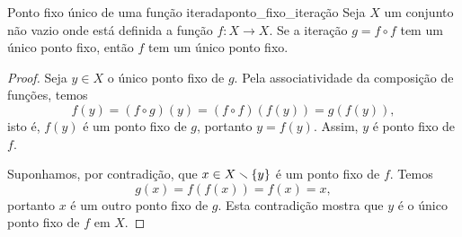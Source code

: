 \begin{lemma}{Ponto fixo único de uma função iterada}{ponto_fixo_iteração}
    Seja \(X\) um conjunto não vazio onde está definida a função \(f : X \to X\). Se a iteração \(g = f\circ f\) tem um único ponto fixo, então \(f\) tem um único ponto fixo.
\end{lemma}
\begin{proof}
    Seja \(y \in X\) o único ponto fixo de \(g\). Pela associatividade da composição de funções, temos
    \begin{equation*}
        f(y) = (f\circ g)(y) = (f\circ f)(f(y)) = g(f(y)),
    \end{equation*}
    isto é, \(f(y)\) é um ponto fixo de \(g\), portanto \(y = f(y)\). Assim, \(y\) é ponto fixo de \(f\).

    Suponhamos, por contradição, que \(x \in X\smallsetminus \{y\}\) é um ponto fixo de \(f\). Temos
    \begin{equation*}
        g(x) = f(f(x)) = f(x) = x,
    \end{equation*}
    portanto \(x\) é um outro ponto fixo de \(g\). Esta contradição mostra que \(y\) é o único ponto fixo de \(f\) em \(X\).
\end{proof}

